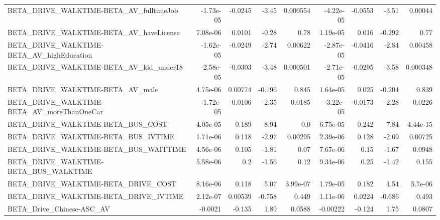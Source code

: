 \begin{tabular}{lrrrrrrrr}
BETA\_DRIVE\_WALKTIME-BETA\_AV\_fulltimeJob            &   -1.73e-05 &      -0.0245 &     -3.45 & 0.000554 &  -4.22e-05 &     -0.0553 &        -3.51 &       0.00044 \\
BETA\_DRIVE\_WALKTIME-BETA\_AV\_haveLicense            &    7.08e-06 &       0.0101 &     -0.28 &     0.78 &   1.19e-05 &       0.016 &       -0.292 &          0.77 \\
BETA\_DRIVE\_WALKTIME-BETA\_AV\_highEducation          &   -1.62e-05 &      -0.0249 &     -2.74 &  0.00622 &  -2.87e-05 &     -0.0416 &        -2.84 &       0.00458 \\
BETA\_DRIVE\_WALKTIME-BETA\_AV\_kid\_under18            &   -2.58e-05 &      -0.0303 &     -3.48 & 0.000501 &  -2.71e-05 &     -0.0295 &        -3.58 &      0.000348 \\
BETA\_DRIVE\_WALKTIME-BETA\_AV\_male                   &    4.75e-06 &      0.00774 &    -0.196 &    0.845 &   1.64e-05 &       0.025 &       -0.204 &         0.839 \\
BETA\_DRIVE\_WALKTIME-BETA\_AV\_moreThanOneCar         &   -1.72e-05 &      -0.0106 &     -2.35 &   0.0185 &  -3.22e-05 &     -0.0173 &        -2.28 &        0.0226 \\
BETA\_DRIVE\_WALKTIME-BETA\_BUS\_COST                  &    4.05e-05 &        0.189 &      8.94 &      0.0 &   6.75e-05 &       0.242 &         7.84 &      4.44e-15 \\
BETA\_DRIVE\_WALKTIME-BETA\_BUS\_IVTIME                &    1.71e-06 &        0.118 &     -2.97 &  0.00295 &   2.39e-06 &       0.128 &        -2.69 &       0.00725 \\
BETA\_DRIVE\_WALKTIME-BETA\_BUS\_WAITTIME              &    4.56e-06 &        0.105 &     -1.81 &     0.07 &   7.67e-06 &        0.15 &        -1.67 &        0.0948 \\
BETA\_DRIVE\_WALKTIME-BETA\_BUS\_WALKTIME              &    5.58e-06 &          0.2 &     -1.56 &     0.12 &   9.34e-06 &        0.25 &        -1.42 &         0.155 \\
BETA\_DRIVE\_WALKTIME-BETA\_DRIVE\_COST                &    8.16e-06 &        0.118 &      5.07 & 3.99e-07 &   1.79e-05 &       0.182 &         4.54 &       5.7e-06 \\
BETA\_DRIVE\_WALKTIME-BETA\_DRIVE\_IVTIME              &    2.12e-07 &      0.00539 &    -0.758 &    0.449 &   1.11e-06 &      0.0224 &       -0.686 &         0.493 \\
BETA\_Drive\_Chinese-ASC\_AV                          &     -0.0021 &       -0.135 &      1.89 &   0.0588 &   -0.00222 &      -0.124 &         1.75 &        0.0807 \\

\end{tabular}
